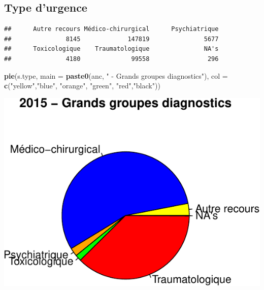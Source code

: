 \documentclass[]{article}
\newenvironment{Shaded}{\begin{snugshade}}{\end{snugshade}}
\newcommand{\KeywordTok}[1]{\textcolor[rgb]{0.13,0.29,0.53}{\textbf{{#1}}}}
\newcommand{\DataTypeTok}[1]{\textcolor[rgb]{0.13,0.29,0.53}{{#1}}}
\newcommand{\StringTok}[1]{\textcolor[rgb]{0.31,0.60,0.02}{{#1}}}
\newcommand{\NormalTok}[1]{{#1}}
\begin{document}
\subsection{Type d'urgence}\label{type-durgence}

\begin{Shaded}
\end{Shaded}

\begin{verbatim}
##      Autre recours Médico-chirurgical      Psychiatrique 
##               8145             147819               5677 
##      Toxicologique    Traumatologique               NA's 
##               4180              99558                296
\end{verbatim}

\begin{Shaded}
\begin{Highlighting}[]
\KeywordTok{pie}\NormalTok{(s.type, }\DataTypeTok{main =} \KeywordTok{paste0}\NormalTok{(anc, }\StringTok{" - Grands groupes diagnostics"}\NormalTok{), }\DataTypeTok{col =} \KeywordTok{c}\NormalTok{(}\StringTok{"yellow"}\NormalTok{,}\StringTok{"blue"}\NormalTok{, }\StringTok{"orange"}\NormalTok{, }\StringTok{"green"}\NormalTok{, }\StringTok{"red"}\NormalTok{,}\StringTok{"black"}\NormalTok{))}
\end{Highlighting}
\end{Shaded}

\includegraphics{analyse_merge_files/figure-latex/type_urgence-1.pdf}
\end{document}
